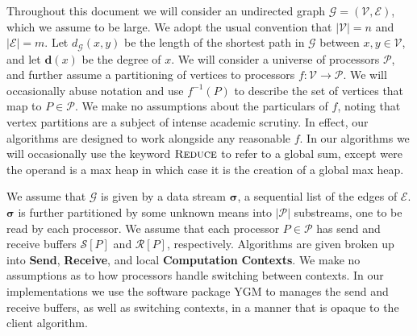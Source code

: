 \documentclass{vldb}
\newcommand{\algoname}[1]{\textnormal{\textsc{#1}}}
\begin{document}
Throughout this document we will consider an undirected graph $\mathcal{G} = (\mathcal{V}, \mathcal{E})$, which we assume to be large.
We adopt the usual convention that  $|\mathcal{V}| = n$ and $|\mathcal{E}| = m$.
Let $d_\mathcal{G}(x, y)$ be the length of the shortest path in $\mathcal{G}$ between $x, y \in \mathcal{V}$, and let $\mathbf{d}(x)$ be the degree of $x$.
We will consider a universe of processors $\mathcal{P}$, and further assume a partitioning of vertices to processors $f : \mathcal{V} \rightarrow \mathcal{P}$. 
We will occasionally abuse notation and use $f^{-1}(P)$ to describe the set of vertices that map to $P \in \mathcal{P}$.
We make no assumptions about the particulars of $f$, noting that vertex partitions are a subject of intense academic scrutiny.
In effect, our algorithms are designed to work alongside any reasonable $f$. 
In our algorithms we will occasionally use the keyword $\algoname{Reduce}$ to refer to a global sum, except were the operand is a max heap in which case it is the creation of a global max heap.

We assume that $\mathcal{G}$ is given by a data stream $\boldsymbol{\sigma}$, a sequential list of the edges of $\mathcal{E}$.
$\boldsymbol{\sigma}$ is further partitioned by some unknown means into $|\mathcal{P}|$ substreams, one to be read by each processor.
We assume that each processor $P \in \mathcal{P}$ has send and receive buffers $\mathcal{S}[P]$ and $\mathcal{R}[P]$, respectively.
Algorithms are given broken up into \textbf{Send}, \textbf{Receive}, and local \textbf{Computation} \textbf{Contexts}.
We make no assumptions as to how processors handle switching between contexts.
In our implementations we use the software package \algoname{YGM} \cite{priest2019you} to manages the send and receive buffers, as well as switching contexts, in a manner that is opaque to the client algorithm.
\end{document}
